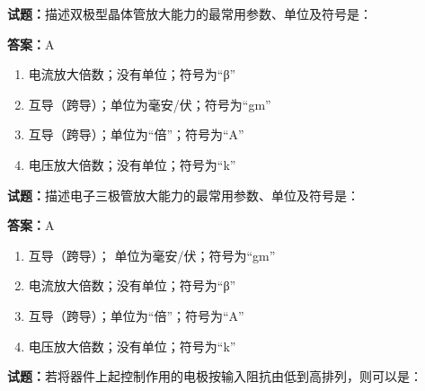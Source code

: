 \documentclass{ctexbook}
\begin{document}




\vspace{1em}

\textbf{试题：}描述双极型晶体管放大能力的最常用参数、单位及符号是： 

\textbf{答案：}A 

\begin{enumerate}[leftmargin=3em]
  \item 电流放大倍数；没有单位；符号为“β” 

  \item 互导（跨导）；单位为毫安/伏；符号为“gm” 

  \item 互导（跨导）；单位为“倍”；符号为“A” 

  \item 电压放大倍数；没有单位；符号为“k” 

\end{enumerate}





\vspace{1em}

\textbf{试题：}描述电子三极管放大能力的最常用参数、单位及符号是： 

\textbf{答案：}A 

\begin{enumerate}[leftmargin=3em]
  \item 互导（跨导）； 单位为毫安/伏；符号为“gm” 

  \item 电流放大倍数；没有单位；符号为“β” 

  \item 互导（跨导）；单位为“倍”；符号为“A” 

  \item 电压放大倍数；没有单位；符号为“k” 

\end{enumerate}






\vspace{1em}

\textbf{试题：}若将器件上起控制作用的电极按输入阻抗由低到高排列，则可以是： 
\end{document}
